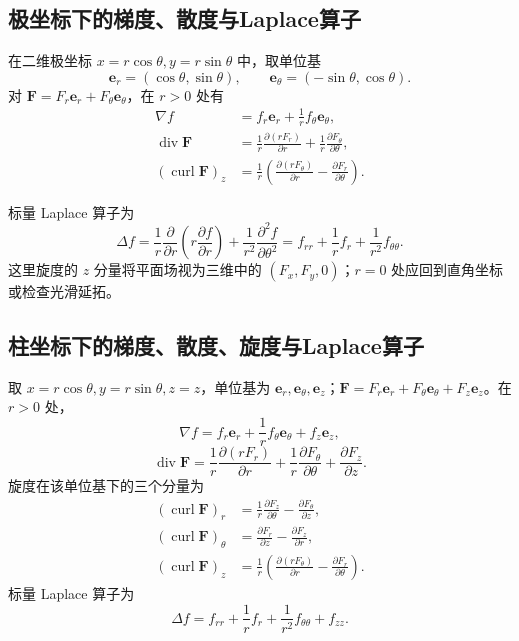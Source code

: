 \documentclass[../main.tex]{subfiles}
\begin{document}
\subsection{极坐标下的梯度、散度与Laplace算子}
在二维极坐标 $x=r\cos\theta,y=r\sin\theta$ 中，取单位基
\[
\bm e_r=(\cos\theta,\sin\theta),\qquad
\bm e_\theta=(-\sin\theta,\cos\theta).
\]
对 $\bm F=F_r\bm e_r+F_\theta\bm e_\theta$，在 $r>0$ 处有
\begin{align*}
\nabla f&=f_r\bm e_r+\frac1r f_\theta\bm e_\theta,\\
\operatorname{div}\bm F
&=\frac1r\frac{\partial(rF_r)}{\partial r}
+\frac1r\frac{\partial F_\theta}{\partial\theta},\\
(\operatorname{curl}\bm F)_z
&=\frac1r\left(\frac{\partial(rF_\theta)}{\partial r}
-\frac{\partial F_r}{\partial\theta}\right).
\end{align*}
\par\pagebreak[0]\begin{samepage}
标量 Laplace 算子为
\[
\Delta f=\frac1r\frac\partial{\partial r}\left(r\frac{\partial f}{\partial r}\right)
+\frac1{r^2}\frac{\partial^2f}{\partial\theta^2}
=f_{rr}+\frac1r f_r+\frac1{r^2}f_{\theta\theta}.
\]
这里旋度的 $z$ 分量将平面场视为三维中的 $(F_x,F_y,0)$；$r=0$ 处应回到直角坐标或检查光滑延拓。
\par\end{samepage}\pagebreak[0]
\subsection{柱坐标下的梯度、散度、旋度与Laplace算子}
取 $x=r\cos\theta,y=r\sin\theta,z=z$，单位基为 $\bm e_r,\bm e_\theta,\bm e_z$；$\bm F=F_r\bm e_r+F_\theta\bm e_\theta+F_z\bm e_z$。在 $r>0$ 处，
\[
\nabla f=f_r\bm e_r+\frac1r f_\theta\bm e_\theta+f_z\bm e_z,
\]
\[
\operatorname{div}\bm F
=\frac1r\frac{\partial(rF_r)}{\partial r}
+\frac1r\frac{\partial F_\theta}{\partial\theta}
+\frac{\partial F_z}{\partial z}.
\]
旋度在该单位基下的三个分量为
\begin{align*}
(\operatorname{curl}\bm F)_r
&=\frac1r\frac{\partial F_z}{\partial\theta}-\frac{\partial F_\theta}{\partial z},\\
(\operatorname{curl}\bm F)_\theta
&=\frac{\partial F_r}{\partial z}-\frac{\partial F_z}{\partial r},\\
(\operatorname{curl}\bm F)_z
&=\frac1r\left(\frac{\partial(rF_\theta)}{\partial r}
-\frac{\partial F_r}{\partial\theta}\right).
\end{align*}
标量 Laplace 算子为
\[
\Delta f=f_{rr}+\frac1r f_r+\frac1{r^2}f_{\theta\theta}+f_{zz}.
\]
\end{document}
